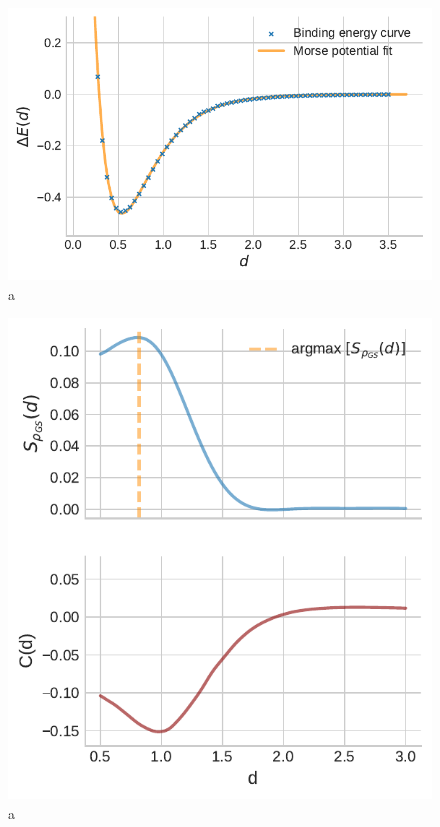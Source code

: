 \documentclass[reprint, amsmath, amssymb, aps]{revtex4-2}
\begin{document}
    \begin{figure}
    \label{fig:binding}
        \includegraphics[scale=0.7]{figures/binding.pdf}
        \caption{a}
    \end{figure}

    \begin{figure}
    \label{fig:entropy_correlation}
        \includegraphics[scale=0.9]{figures/entropy_correlation.pdf}
        \caption{a}
    \end{figure}
\end{document}
